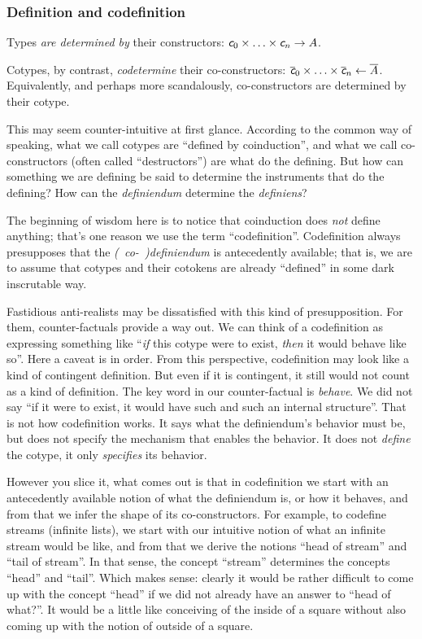 \documentclass{article}
\begin{document}
\subsubsection{Definition and codefinition}

Types \textit{are determined by} their constructors: \(\ctor{0}\times\ldots\times\ctor{n} \rightarrow A\).

Cotypes, by contrast, \textit{codetermine} their co-constructors:
\(\coctor{0}\times\ldots\times\coctor{n} \leftarrow \cotype{A}\).
Equivalently, and perhaps more scandalously, co-constructors are
determined by their cotype.

This may seem counter-intuitive at first glance. According to the
common way of speaking, what we call cotypes are ``defined by
coinduction'', and what we call co-constructors (often called
``destructors'') are what do the defining. But how can something we
are defining be said to determine the instruments that do the
defining? How can the \textit{definiendum} determine the
\textit{definiens}?

The beginning of wisdom here is to notice that coinduction does
\textit{not} define anything; that's one reason we use the term
``codefinition''. Codefinition always presupposes that the
\textit{(~co-~)definiendum} is antecedently available; that is, we are
to assume that cotypes and their cotokens are already ``defined'' in
some dark inscrutable way.

Fastidious anti-realists may be dissatisfied with this kind of
presupposition. For them, counter-factuals provide a way out. We can
think of a codefinition as expressing something like ``\textit{if}
this cotype were to exist, \textit{then} it would behave like so''.
Here a caveat is in order. From this perspective, codefinition may
look like a kind of contingent definition. But even if it is
contingent, it still would not count as a kind of definition. The key
word in our counter-factual is \textit{behave}. We did not say ``if it
were to exist, it would have such and such an internal structure''.
That is not how codefinition works. It says what the definiendum's
behavior must be, but does not specify the mechanism that enables the
behavior. It does not \textit{define} the cotype, it only
\textit{specifies} its behavior.

However you slice it, what comes out is that in codefinition we start
with an antecedently available notion of what the definiendum is, or
how it behaves, and from that we infer the shape of its
co-constructors. For example, to codefine streams (infinite lists), we
start with our intuitive notion of what an infinite stream would be
like, and from that we derive the notions ``head of stream'' and ``tail
of stream''. In that sense, the concept ``stream'' determines the
concepts ``head'' and ``tail''. Which makes sense: clearly it would be
rather difficult to come up with the concept ``head'' if we did not
already have an answer to ``head of what?''. It would be a little
like conceiving of the inside of a square without also coming up with
the notion of outside of a square.
\end{document}
